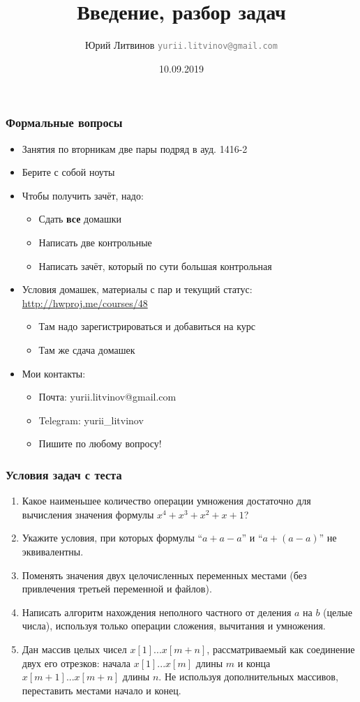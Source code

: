 \documentclass[xetex,mathserif,serif]{beamer}
\title{Введение, разбор задач}
\author[Юрий Литвинов]{Юрий Литвинов \newline \textcolor{gray}{\small\texttt{yurii.litvinov@gmail.com}}}
\date{10.09.2019}
\begin{document}
	
	\frame{\titlepage}
	
	\begin{frame}
		\frametitle{Формальные вопросы}
		\begin{itemize}
			\item Занятия по вторникам две пары подряд в ауд. 1416-2
			\item Берите с собой ноуты
			\item Чтобы получить зачёт, надо:
			\begin{itemize}
				\item Сдать \textbf{все} домашки
				\item Написать две контрольные
				\item Написать зачёт, который по сути большая контрольная
			\end{itemize}
			\item Условия домашек, материалы с пар и текущий статус: \url{http://hwproj.me/courses/48}
			\begin{itemize}
				\item Там надо зарегистрироваться и добавиться на курс
				\item Там же сдача домашек
			\end{itemize}
			\item Мои контакты:
			\begin{itemize}
				\item Почта: yurii.litvinov@gmail.com
				\item Telegram: yurii\_litvinov
				\item Пишите по любому вопросу!
			\end{itemize}
		\end{itemize}
	\end{frame}

	\begin{frame}
		\frametitle{Условия задач с теста}
		\begin{enumerate}
			\item Какое наименьшее количество операции умножения достаточно для вычисления значения формулы $x^4 + x^3 + x^2 + x + 1$?
			\item Укажите условия, при которых формулы ``$a + a - a$'' и ``$a + (a - a)$'' не эквивалентны.
			\item Поменять значения двух целочисленных переменных местами (без привлечения третьей переменной и файлов).
			\item Написать алгоритм нахождения неполного частного от деления $a$ на $b$ (целые числа), используя только операции сложения, вычитания и умножения.
			\item Дан массив целых чисел $x[1]...x[m+n]$, рассматриваемый как соединение двух его отрезков: начала $x[1]...x[m]$ длины $m$ и конца $x[m+1]...x[m+n]$ длины $n$. Не используя дополнительных массивов, переставить местами начало и конец.
		\end{enumerate}
	\end{frame}
\end{document}
